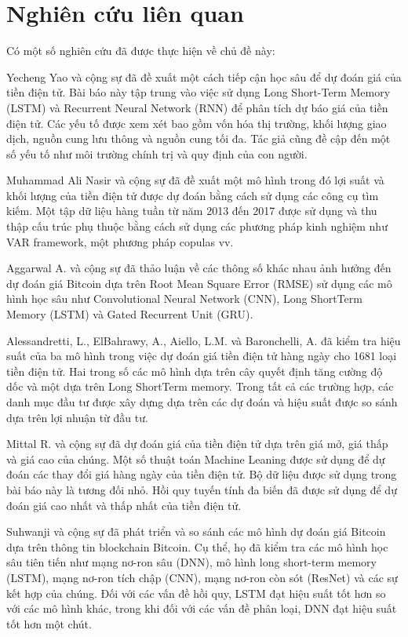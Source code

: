 \documentclass[conference]{IEEEtran}
\begin{document}
\section{Nghiên cứu liên quan}

Có một số nghiên cứu đã được thực hiện về chủ đề này:\par
Yecheng Yao và cộng sự \cite{b1} đã đề xuất một cách tiếp cận học sâu để dự đoán giá của tiền điện tử. Bài báo này tập trung vào việc sử dụng Long Short-Term Memory (LSTM) và Recurrent Neural Network (RNN) để phân tích dự báo giá của tiền điện tử. Các yếu tố được xem xét bao gồm vốn hóa thị trường, khối lượng giao dịch, nguồn cung lưu thông và nguồn cung tối đa. Tác giả cũng đề cập đến một số yếu tố như môi trường chính trị và quy định của con người.\par
Muhammad Ali Nasir và cộng sự \cite{b2} đã đề xuất một mô hình trong đó lợi suất và khối lượng của tiền điện tử được dự đoán bằng cách sử dụng các công cụ tìm kiếm. Một tập dữ liệu hàng tuần từ năm 2013 đến 2017 được sử dụng và thu thập cấu trúc phụ thuộc bằng cách sử dụng các phương pháp kinh nghiệm như VAR framework, một phương pháp copulas vv.\par
Aggarwal A. và cộng sự \cite{b3} đã thảo luận về các thông số khác nhau ảnh hưởng đến dự đoán giá Bitcoin dựa trên Root Mean Square Error (RMSE) sử dụng các mô hình học sâu như Convolutional Neural Network (CNN), Long ShortTerm Memory (LSTM) và Gated Recurrent Unit (GRU).\par
Alessandretti, L., ElBahrawy, A., Aiello, L.M. và Baronchelli, A. \cite{b4} đã kiểm tra hiệu suất của ba mô hình trong việc dự đoán giá tiền điện tử hàng ngày cho 1681 loại tiền điện tử. Hai trong số các mô hình dựa trên cây quyết định tăng cường độ dốc và một dựa trên Long ShortTerm memory. Trong tất cả các trường hợp, các danh mục đầu tư được xây dựng dựa trên các dự đoán và hiệu suất được so sánh dựa trên lợi nhuận từ đầu tư.\par
Mittal R. và cộng sự \cite{b5} đã dự đoán giá của tiền điện tử dựa trên giá mở, giá thấp và giá cao của chúng. Một số thuật toán Machine Leaning được sử dụng để dự đoán các thay đổi giá hàng ngày của tiền điện tử. Bộ dữ liệu được sử dụng trong bài báo này là tương đối nhỏ. Hồi quy tuyến tính đa biến đã được sử dụng để dự đoán giá cao nhất và thấp nhất của tiền điện tử.\par
Suhwanji và cộng sự \cite{b6} đã phát triển và so sánh các mô hình dự đoán giá Bitcoin dựa trên thông tin blockchain Bitcoin. Cụ thể, họ đã kiểm tra các mô hình học sâu tiên tiến như mạng nơ-ron sâu (DNN), mô hình long short-term memory (LSTM), mạng nơ-ron tích chập (CNN), mạng nơ-ron còn sót (ResNet) và các sự kết hợp của chúng. Đối với các vấn đề hồi quy, LSTM đạt hiệu suất tốt hơn so với các mô hình khác, trong khi đối với các vấn đề phân loại, DNN đạt hiệu suất tốt hơn một chút.\par
\end{document}
